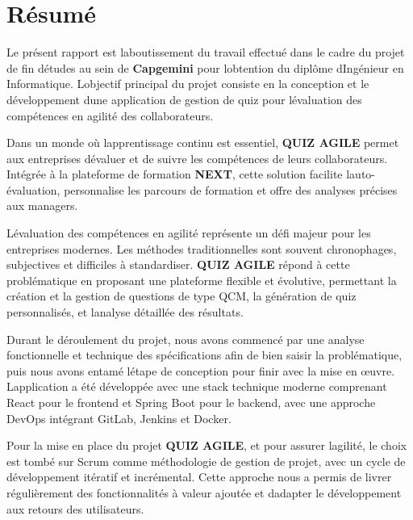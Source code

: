 \documentclass[12pt,a4paper,twoside]{report}
\begin{document}
\hypertarget{ruxe9sumuxe9}{%
\section{Résumé}\label{ruxe9sumuxe9}}

Le présent rapport est l\textquotesingle aboutissement du travail
effectué dans le cadre du projet de fin d\textquotesingle études au sein
de \textbf{Capgemini} pour l\textquotesingle obtention du diplôme
d\textquotesingle Ingénieur en Informatique. L\textquotesingle objectif
principal du projet consiste en la conception et le développement
d\textquotesingle une application de gestion de quiz pour
l\textquotesingle évaluation des compétences en agilité des
collaborateurs.

Dans un monde où l\textquotesingle apprentissage continu est essentiel,
\textbf{QUIZ AGILE} permet aux entreprises d\textquotesingle évaluer et
de suivre les compétences de leurs collaborateurs. Intégrée à la
plateforme de formation \textbf{NEXT}, cette solution facilite
l\textquotesingle auto-évaluation, personnalise les parcours de
formation et offre des analyses précises aux managers.

L\textquotesingle évaluation des compétences en agilité représente un
défi majeur pour les entreprises modernes. Les méthodes traditionnelles
sont souvent chronophages, subjectives et difficiles à standardiser.
\textbf{QUIZ AGILE} répond à cette problématique en proposant une
plateforme flexible et évolutive, permettant la création et la gestion
de questions de type QCM, la génération de quiz personnalisés, et
l\textquotesingle analyse détaillée des résultats.

Durant le déroulement du projet, nous avons commencé par une analyse
fonctionnelle et technique des spécifications afin de bien saisir la
problématique, puis nous avons entamé l\textquotesingle étape de
conception pour finir avec la mise en œuvre.
L\textquotesingle application a été développée avec une stack technique
moderne comprenant React pour le frontend et Spring Boot pour le
backend, avec une approche DevOps intégrant GitLab, Jenkins et Docker.

Pour la mise en place du projet \textbf{QUIZ AGILE}, et pour assurer
l\textquotesingle agilité, le choix est tombé sur Scrum comme
méthodologie de gestion de projet, avec un cycle de développement
itératif et incrémental. Cette approche nous a permis de livrer
régulièrement des fonctionnalités à valeur ajoutée et
d\textquotesingle adapter le développement aux retours des utilisateurs.
\end{document}
